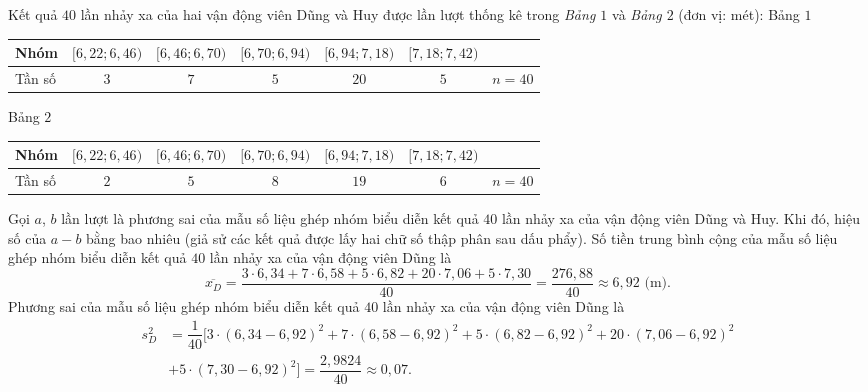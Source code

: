\begin{bt}%
	Kết quả $40$ lần nhảy xa của hai vận động viên Dũng và Huy được lần lượt thống kê trong \textit{Bảng $1$} và \textit{Bảng $2$} (đơn vị: mét):
	Bảng $1$ 
	\begin{center}
		\begin{tabular}{|>{\centering\arraybackslash}m{3cm}|c|c|c|c|c|c|}
			\hline
			Nhóm & $[6{,}22; 6{,}46)$ & $[6{,}46; 6{,}70)$ & $[6{,}70; 6{,}94)$ & $[6{,}94; 7{,}18)$ & $[7{,}18; 7{,}42)$ &   \\ \hline
			Tần số & $3$ & $7$ & $5$ & $20$ & $5$ & $n = 40$ \\ \hline
		\end{tabular} 
	\end{center}
	Bảng $2$
	\begin{center}
		\begin{tabular}{|>{\centering\arraybackslash}m{3cm}|c|c|c|c|c|c|}
			\hline
			Nhóm & $[6{,}22; 6{,}46)$ & $[6{,}46; 6{,}70)$ & $[6{,}70; 6{,}94)$ & $[6{,}94; 7{,}18)$ & $[7{,}18; 7{,}42)$ &   \\ \hline
			Tần số & $2$ & $5$ & $8$ & $19$ & $6$ & $n = 40$ \\ \hline
		\end{tabular} 
	\end{center}
	Gọi $a$, $b$ lần lượt là phương sai của mẫu số liệu ghép nhóm biểu diễn kết quả $40$ lần nhảy xa của vận động viên Dũng và Huy. Khi đó, hiệu số của $a - b$ bằng bao nhiêu (giả sử các kết quả được lấy hai chữ số thập phân sau dấu phẩy).
	\loigiai
	{ Số tiền trung bình cộng của mẫu số liệu ghép nhóm biểu diễn kết quả $40$ lần nhảy xa của vận động viên Dũng là
		\[\overline{x_D} = \dfrac{3 \cdot 6{,}34 + 7 \cdot 6{,}58 + 5 \cdot 6{,}82 + 20 \cdot 7{,}06 + 5 \cdot 7{,}30}{40} = \dfrac{276{,}88}{40} \approx 6{,}92 \text{ (m).}\]
		Phương sai của mẫu số liệu ghép nhóm biểu diễn kết quả $40$ lần nhảy xa của vận động viên Dũng là 
		\begin{align*}
		s_D^2 &= \dfrac{1}{40}\big[3 \cdot (6{,}34 - 6{,}92)^2 + 7 \cdot (6{,}58 - 6{,}92)^2 + 5 \cdot (6{,}82 - 6{,}92)^2 + 20 \cdot (7{,}06 - 6{,}92)^2 \\
		&+ 5 \cdot (7{,}30 - 6{,}92)^2 \big] = \dfrac{2{,}9824}{40} \approx 0{,}07.

\end{align*}}
\end{bt}
